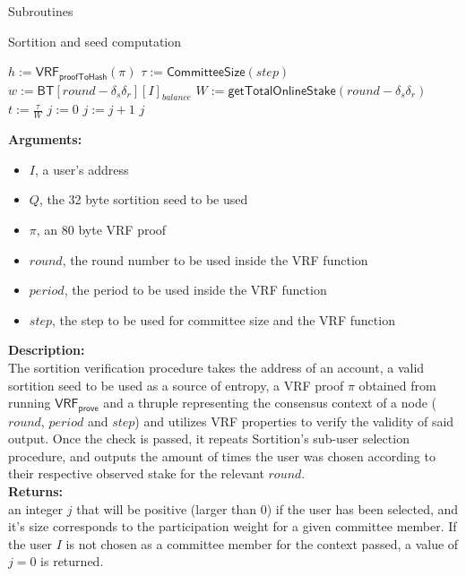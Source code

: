 \documentclass[10pt,a4paper]{article}
\begin{document}
\begin{section}{Subroutines}
\begin{subsection}{Sortition and seed computation}
\begin{algorithm}[H]
\begin{algorithmic}[1]
        \State $h := \mathsf{VRF_{proofToHash}}(\pi)$
        \State $\tau := \mathsf{CommitteeSize}(step)$
        \State $w := \mathsf{BT}[round-\delta_s\delta_r][I]_{balance}$
        \State $W := \mathsf{getTotalOnlineStake}(round-\delta_s\delta_r)$
        \State $t := \frac{\tau}{W}$
        \State $j := 0$
        \While{$\frac{sh}{2^{\mathsf{log_2}(h)}} \notin [\sum_{k=0}^j\mathsf{B}(k;w,t), \sum_{k=0}^{j+1}\mathsf{B}(k;w,t))$}
            \State $j := j+1$
        \EndWhile
        \Return $j$
    \EndFunction
    \end{algorithmic}
    \caption{\underline{Verify Sortition}}
\end{algorithm}

\noindent \textbf{Arguments:}
\begin{itemize}
    \item $I$, a user's address
    \item $Q$, the 32 byte sortition seed to be used
    \item $\pi$, an 80 byte VRF proof
    \item $round$, the round number to be used inside the VRF function
    \item $period$, the period to be used inside the VRF function
    \item $step$, the step to be used for committee size and the VRF function
  \end{itemize}

\noindent \textbf{Description:}\\
The sortition verification procedure takes the address of an account,
a valid sortition seed to be used as a source of entropy,
a VRF proof $\pi$ obtained from running $\mathsf{VRF_{prove}}$ and 
a thruple representing the consensus context of a node ($round$, $period$ and $step$) and utilizes 
VRF properties to verify the validity of said output.
Once the check is passed, it repeats Sortition's sub-user selection procedure, 
and outputs the amount of times the user was chosen according to their respective 
observed stake for the relevant $round$.\\

\noindent \textbf{Returns:} \\
an integer $j$ that will be positive (larger than 0) if the user has been 
    selected, and it's size corresponds to the participation weight for a given committee member.
    If the user $I$ is not chosen as a committee member for the context passed, 
    a value of $j = 0$ is returned.

\end{subsection}


\end{section}
\end{document}

